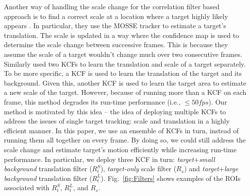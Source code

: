 \documentclass{bmvc2k}
\begin{document}
Another way of handling the scale change for the correlation filter
based approach is to find a correct scale at a location where a target
highly likely appears \cite{zhang2014fast}. In particular, they use
the MOSSE tracker to estimate a target's translation. The scale is
updated in a way where the confidence map is used to determine the
scale change between successive frames. This is because they assume
the scale of a target wouldn't change much over two consecutive
frames. Similarly \cite{ma2015long} used two KCFs to learn the
translation and scale of a target separately. To be more specific, a
KCF is used to learn the translation of the target and its
background. Given this, another KCF is used to learn the target area
to estimate a new scale of the target. However, because of running
more than a KCF on each frame, this method degrades its run-time
performance (i.e., $\leq 50 fps$). Our method is motivated by this
idea -- the idea of deploying multiple KCFs to address the issues of
single target tracking: scale and translation in a highly efficient
manner.  In this paper, we use an ensemble of KCFs in turn, instead of
running them all together on every frame. By doing so, we could still
address the scale change and estimate target's motion efficiently
while increasing run-time performance. In particular, we deploy three
KCF in turn: \textit{target}+\textit{small background} translation
filter ($R_{t}^{S}$), \textit{target-only} scale filter ($R_{s}$) and
\textit{target}+\textit{large background} translation filter
($R_{t}^{L}$). Fig.~\ref{fig:Filters} shows examples of the ROIs
associated with $R_{t}^{S}$, $R_{t}^{L}$, and $R_{s}$.

\end{document}
